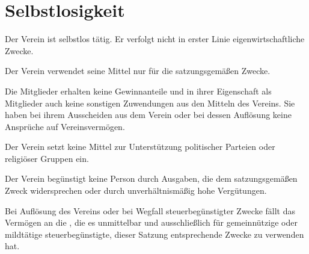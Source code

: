 \section{Selbstlosigkeit}
	\begin{absätze}
		\item Der Verein ist selbstlos tätig. Er verfolgt nicht in erster Linie eigenwirtschaftliche Zwecke.
		\item Der Verein verwendet seine Mittel nur für die satzungsgemäßen Zwecke.
		\item Die Mitglieder erhalten keine Gewinnanteile und in ihrer Eigenschaft als Mitglieder auch keine sonstigen Zuwendungen aus den Mitteln des Vereins. Sie haben bei ihrem Ausscheiden aus dem Verein oder bei dessen Auflösung keine Ansprüche auf Vereinsvermögen.
		\item Der Verein setzt keine Mittel zur Unterstützung politischer Parteien oder religiöser Gruppen ein.
		\item Der Verein begünstigt keine Person durch Ausgaben, die dem satzungsgemäßen Zweck widersprechen oder durch unverhältnismäßig hohe Vergütungen.
		\item Bei Auflösung des Vereins oder bei Wegfall steuerbegünstigter Zwecke fällt das Vermögen an die \Uni{}, die es unmittelbar und ausschließlich für gemeinnützige oder mildtätige steuerbegünstigte, dieser Satzung entsprechende Zwecke zu verwenden hat.
	\end{absätze}
